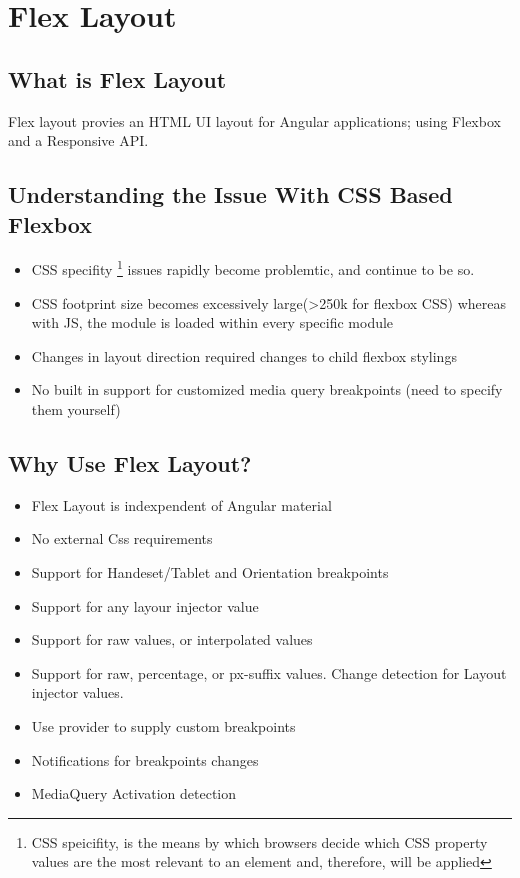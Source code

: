 
\chapter{ Flex Layout }

\section{ What is Flex Layout }
Flex layout provies an HTML UI layout for Angular applications; using Flexbox
and a Responsive API.

\section{ Understanding the Issue With CSS Based Flexbox }
\begin{itemize}
  \item CSS specifity \footnote{CSS speicifity, is the means by which browsers
  decide which CSS property values are the most relevant to an element and,
  therefore, will be applied} issues rapidly become problemtic, and continue
  to be so.
  \item CSS footprint size becomes excessively large(>250k for flexbox CSS)
  whereas with JS, the module is loaded within every specific module
  \item Changes in layout direction required changes to child flexbox stylings
  \item No built in support for customized media query breakpoints (need to 
  specify them yourself)
\end{itemize}

\section{ Why Use Flex Layout? }
\begin{itemize}
  \item Flex Layout is indexpendent of Angular material
  \item No external Css requirements
  \item Support for Handeset/Tablet and Orientation breakpoints
  \item Support for any layour injector value
  \item Support for raw values, or interpolated values
  \item Support for raw, percentage, or px-suffix values. Change detection
  for Layout injector values.
  \item Use provider to supply custom breakpoints
  \item Notifications for breakpoints changes
  \item MediaQuery Activation detection
\end{itemize}


